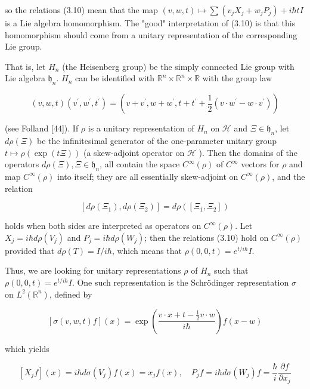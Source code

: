 \documentclass[10pt, letterpaper]{article}
\begin{document}
so the relations (3.10) mean that the map $(v, w, t) \mapsto \sum\left(v_{j} X_{j}+w_{j} P_{j}\right)+i \hbar t I$ is a Lie algebra homomorphism. The "good" interpretation of (3.10) is that this homomorphism should come from a unitary representation of the corresponding Lie group.

That is, let $H_{n}$ (the Heisenberg group) be the simply connected Lie group with Lie algebra $\mathfrak{h}_{n}$. $H_{n}$ can be identified with $\mathbb{R}^{n} \times \mathbb{R}^{n} \times \mathbb{R}$ with the group law

$$
(v, w, t)\left(v^{\prime}, w^{\prime}, t^{\prime}\right)=\left(v+v^{\prime}, w+w^{\prime}, t+t^{\prime}+\frac{1}{2}\left(v \cdot w^{\prime}-w \cdot v^{\prime}\right)\right)
$$

(see Folland [44]). If $\rho$ is a unitary representation of $H_{n}$ on $\mathcal{H}$ and $\Xi \in \mathfrak{h}_{n}$, let $d \rho(\Xi)$ be the infinitesimal generator of the one-parameter unitary group $t \mapsto \rho(\exp (t \Xi))$ (a skew-adjoint operator on $\mathcal{H}$ ). Then the domains of the operators $d \rho(\Xi), \Xi \in \mathfrak{h}_{n}$, all contain the space $C^{\infty}(\rho)$ of $C^{\infty}$ vectors for $\rho$ and map $C^{\infty}(\rho)$ into itself; they are all essentially skew-adjoint on $C^{\infty}(\rho)$, and the relation

$$
\left[d \rho\left(\Xi_{1}\right), d \rho\left(\Xi_{2}\right)\right]=d \rho\left(\left[\Xi_{1}, \Xi_{2}\right]\right)
$$

holds when both sides are interpreted as operators on $C^{\infty}(\rho)$. Let $X_{j}=i \hbar d \rho\left(V_{j}\right)$ and $P_{j}=i \hbar d \rho\left(W_{j}\right)$; then the relations (3.10) hold on $C^{\infty}(\rho)$ provided that $d \rho(T)= I / i \hbar$, which means that $\rho(0,0, t)=e^{t / i \hbar} I$.

Thus, we are looking for unitary representations $\rho$ of $H_{n}$ such that $\rho(0,0, t)= e^{t / i \hbar} I$. One such representation is the Schrödinger representation $\sigma$ on $L^{2}\left(\mathbb{R}^{n}\right)$, defined by

$$
[\sigma(v, w, t) f](x)=\exp \left(\frac{v \cdot x+t-\frac{1}{2} v \cdot w}{i \hbar}\right) f(x-w)
$$

which yields

$$
\left[X_{j} f\right](x)=i \hbar d \sigma\left(V_{j}\right) f(x)=x_{j} f(x), \quad P_{j} f=i \hbar d \sigma\left(W_{j}\right) f=\frac{\hbar}{i} \frac{\partial f}{\partial x_{j}}
$$
\end{document}

